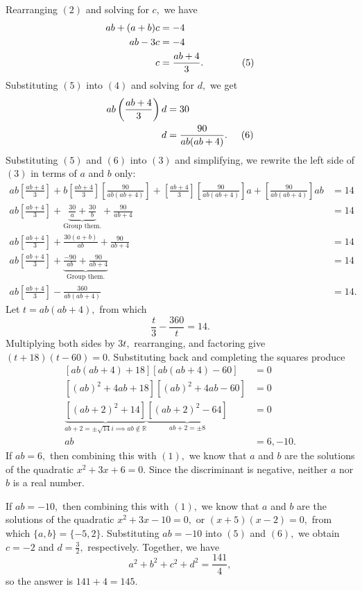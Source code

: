 \begin{enumerate}
 Rearranging $(2)$ and solving for $c,$ we have
 \begin{align*} ab+(a+b)c&=-4 \\ ab-3c&=-4 \\ c&=\frac{ab+4}{3}. \hspace{14mm} (5) \end{align*}
Substituting $(5)$ into $(4)$ and solving for $d,$ we get
 \begin{align*} ab\left(\frac{ab+4}{3}\right)d&=30 \\ d&=\frac{90}{ab(ab+4)}. \hspace{5mm} (6)  \end{align*}
Substituting $(5)$ and $(6)$ into $(3)$ and simplifying, we rewrite the left side of $(3)$ in terms of $a$ and $b$ only:
 \begin{align*} ab\left[\frac{ab+4}{3}\right] + b\left[\frac{ab+4}{3}\right]\left[\frac{90}{ab(ab+4)}\right] + \left[\frac{ab+4}{3}\right]\left[\frac{90}{ab(ab+4)}\right]a + \left[\frac{90}{ab(ab+4)}\right]ab &= 14 \\ ab\left[\frac{ab+4}{3}\right] + \underbrace{\frac{30}{a} + \frac{30}{b}}_{\text{Group them.}} + \frac{90}{ab+4} &= 14 \\ ab\left[\frac{ab+4}{3}\right] + \frac{30(a+b)}{ab} + \frac{90}{ab+4} &= 14 \\ ab\left[\frac{ab+4}{3}\right] + \underbrace{\frac{-90}{ab} + \frac{90}{ab+4}}_{\text{Group them.}} &= 14 \\ ab\left[\frac{ab+4}{3}\right] - \frac{360}{ab(ab+4)}&=14. \end{align*}
Let $t=ab(ab+4),$ from which 
 \[\frac{t}{3}-\frac{360}{t}=14.\] Multiplying both sides by $3t,$ rearranging, and factoring give $(t+18)(t-60)=0.$ Substituting back and completing the squares produce
 \begin{align*} \left[ab(ab+4)+18\right]\left[ab(ab+4)-60\right]&=0 \\ \left[(ab)^2+4ab+18\right]\left[(ab)^2+4ab-60\right]&=0 \\ \underbrace{\left[(ab+2)^2+14\right]}_{ab+2=\pm\sqrt{14}i\implies ab\not\in\mathbb R}\underbrace{\left[(ab+2)^2-64\right]}_{ab+2=\pm8}&=0 \\ ab&=6,-10. \end{align*}
If $ab=6,$ then combining this with $(1),$ we know that $a$ and $b$ are the solutions of the quadratic $x^2+3x+6=0.$ Since the discriminant is negative, neither $a$ nor $b$ is a real number.

 If $ab=-10,$ then combining this with $(1),$ we know that $a$ and $b$ are the solutions of the quadratic $x^2+3x-10=0,$ or $(x+5)(x-2)=0,$ from which $\{a,b\}=\{-5,2\}.$ Substituting $ab=-10$ into $(5)$ and $(6),$ we obtain $c=-2$ and $d=\frac32,$ respectively. Together, we have 
 \[a^2+b^2+c^2+d^2=\frac{141}{4},\] so the answer is $141+4=\boxed{145}.$





\end{enumerate}
